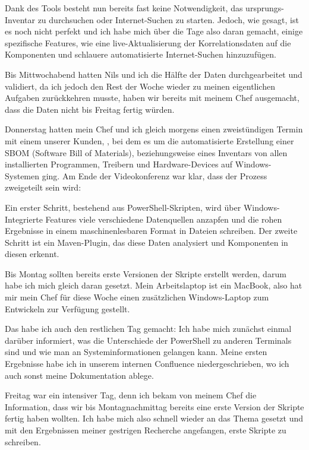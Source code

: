 Dank des Tools besteht nun bereits fast keine Notwendigkeit, das ursprungs-Inventar zu durchsuchen oder Internet-Suchen zu starten.
Jedoch, wie gesagt, ist es noch nicht perfekt und ich habe mich über die Tage also daran gemacht, einige spezifische Features, wie eine live-Aktualisierung der Korrelationsdaten auf die Komponenten und schlauere automatisierte Internet-Suchen hinzuzufügen.

Bis Mittwochabend hatten Nils und ich die Hälfte der Daten durchgearbeitet und validiert, da ich jedoch den Rest der Woche wieder zu meinen eigentlichen Aufgaben zurückkehren musste, haben wir bereits mit meinem Chef ausgemacht, dass die Daten nicht bis Freitag fertig würden.


Donnerstag hatten mein Chef und ich gleich morgens einen zweistündigen Termin mit einem unserer Kunden, {\aeclientZEZESE}, bei dem es um die automatisierte Erstellung einer SBOM (Software Bill of Materials),
beziehungsweise eines Inventars von allen installierten Programmen, Treibern und Hardware-Devices auf Windows-Systemen ging.
Am Ende der Videokonferenz war klar, dass der Prozess zweigeteilt sein wird:

Ein erster Schritt, bestehend aus PowerShell-Skripten, wird über Windows-Integrierte Features viele verschiedene Datenquellen anzapfen und die rohen Ergebnisse in einem maschinenlesbaren Format in Dateien schreiben.
Der zweite Schritt ist ein Maven-Plugin, das diese Daten analysiert und Komponenten in diesen erkennt.

Bis Montag sollten bereits erste Versionen der Skripte erstellt werden, darum habe ich mich gleich daran gesetzt.
Mein Arbeitslaptop ist ein MacBook, also hat mir mein Chef für diese Woche einen zusätzlichen Windows-Laptop zum Entwickeln zur Verfügung gestellt.

Das habe ich auch den restlichen Tag gemacht:
Ich habe mich zunächst einmal darüber informiert, was die Unterschiede der PowerShell zu anderen Terminals sind und wie man an Systeminformationen gelangen kann.
Meine ersten Ergebnisse habe ich in unserem internen Confluence niedergeschrieben, wo ich auch sonst meine Dokumentation ablege.


Freitag war ein intensiver Tag, denn ich bekam von meinem Chef die Information, dass wir bis Montagnachmittag bereits eine erste Version der Skripte fertig haben wollten.
Ich habe mich also schnell wieder an das Thema gesetzt und mit den Ergebnissen meiner gestrigen Recherche angefangen, erste Skripte zu schreiben.

